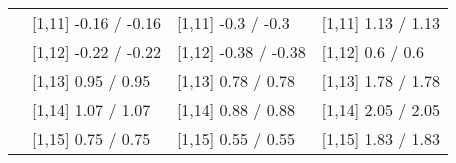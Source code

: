 \begin{table}
\begin{tabular}[t]{llll}
 & {}[1,11] -0.16  / -0.16 & {}[1,11] -0.3  / -0.3 & {}[1,11] 1.13  / 1.13\\
 & {}[1,12] -0.22  / -0.22 & {}[1,12] -0.38  / -0.38 & {}[1,12] 0.6  / 0.6\\
\addlinespace
 & {}[1,13] 0.95  / 0.95 & {}[1,13] 0.78  / 0.78 & {}[1,13] 1.78  / 1.78\\
 & {}[1,14] 1.07  / 1.07 & {}[1,14] 0.88  / 0.88 & {}[1,14] 2.05  / 2.05\\
 & {}[1,15] 0.75  / 0.75 & {}[1,15] 0.55  / 0.55 & {}[1,15] 1.83  / 1.83\\
\bottomrule
\end{tabular}
\end{table}
